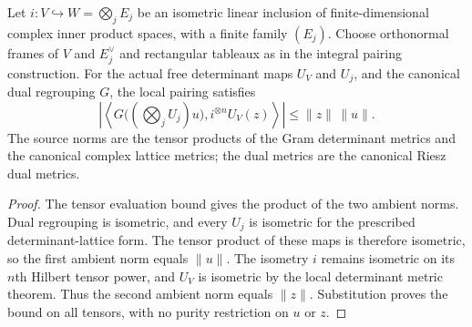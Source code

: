 \begin{lemma}
\label{lem:free-determinant-contraction}
\leanok
Let $i:V\hookrightarrow W=\bigotimes_jE_j$ be an isometric linear
inclusion of finite-dimensional complex inner product spaces, with a
finite family $(E_j)$. Choose orthonormal frames of $V$ and $E_j^\vee$
and rectangular tableaux as in the integral pairing construction.
For the actual free determinant maps $U_V$ and $U_j$, and the canonical
dual regrouping $G$, the local pairing satisfies
\[
 \left|\left\langle G\bigl((\bigotimes_jU_j)u\bigr),
           i^{\otimes n}U_V(z)\right\rangle\right|
 \leq \|z\|\,\|u\|.
\]
The source norms are the tensor products of the Gram determinant metrics
and the canonical complex lattice metrics; the dual metrics are the
canonical Riesz dual metrics.
\end{lemma}
\begin{proof}
The tensor evaluation bound gives the product of the two ambient
norms. Dual regrouping is isometric, and every $U_j$ is isometric
for the prescribed determinant-lattice form. The tensor product of
these maps is therefore isometric, so the first ambient norm equals
$\|u\|$. The isometry $i$ remains isometric on its $n$th Hilbert tensor
power, and $U_V$ is isometric by the local determinant metric theorem.
Thus the second ambient norm equals $\|z\|$. Substitution proves the
bound on all tensors, with no purity restriction on $u$ or $z$.
\end{proof}

